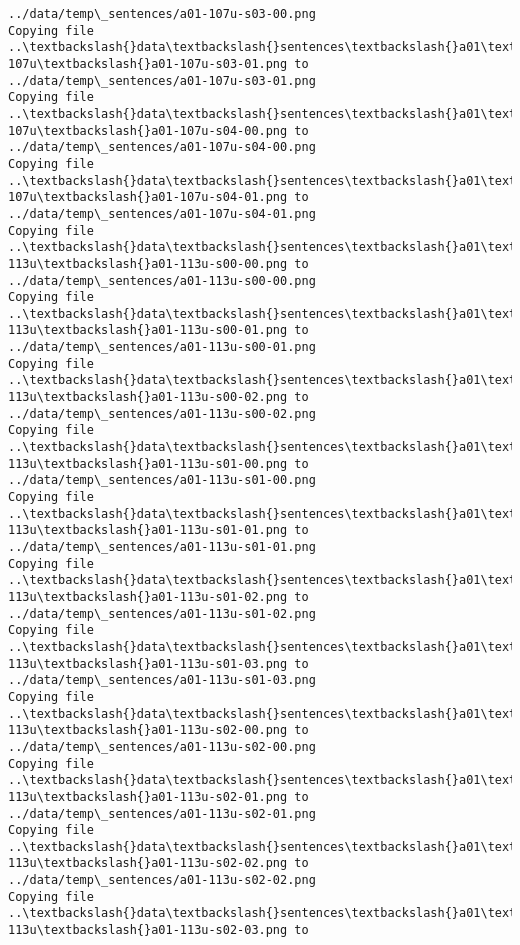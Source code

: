 \documentclass[11pt]{article}
\begin{document}
\begin{Verbatim}[commandchars=\\\{\}]
../data/temp\_sentences/a01-107u-s03-00.png
Copying file ..\textbackslash{}data\textbackslash{}sentences\textbackslash{}a01\textbackslash{}a01-107u\textbackslash{}a01-107u-s03-01.png to
../data/temp\_sentences/a01-107u-s03-01.png
Copying file ..\textbackslash{}data\textbackslash{}sentences\textbackslash{}a01\textbackslash{}a01-107u\textbackslash{}a01-107u-s04-00.png to
../data/temp\_sentences/a01-107u-s04-00.png
Copying file ..\textbackslash{}data\textbackslash{}sentences\textbackslash{}a01\textbackslash{}a01-107u\textbackslash{}a01-107u-s04-01.png to
../data/temp\_sentences/a01-107u-s04-01.png
Copying file ..\textbackslash{}data\textbackslash{}sentences\textbackslash{}a01\textbackslash{}a01-113u\textbackslash{}a01-113u-s00-00.png to
../data/temp\_sentences/a01-113u-s00-00.png
Copying file ..\textbackslash{}data\textbackslash{}sentences\textbackslash{}a01\textbackslash{}a01-113u\textbackslash{}a01-113u-s00-01.png to
../data/temp\_sentences/a01-113u-s00-01.png
Copying file ..\textbackslash{}data\textbackslash{}sentences\textbackslash{}a01\textbackslash{}a01-113u\textbackslash{}a01-113u-s00-02.png to
../data/temp\_sentences/a01-113u-s00-02.png
Copying file ..\textbackslash{}data\textbackslash{}sentences\textbackslash{}a01\textbackslash{}a01-113u\textbackslash{}a01-113u-s01-00.png to
../data/temp\_sentences/a01-113u-s01-00.png
Copying file ..\textbackslash{}data\textbackslash{}sentences\textbackslash{}a01\textbackslash{}a01-113u\textbackslash{}a01-113u-s01-01.png to
../data/temp\_sentences/a01-113u-s01-01.png
Copying file ..\textbackslash{}data\textbackslash{}sentences\textbackslash{}a01\textbackslash{}a01-113u\textbackslash{}a01-113u-s01-02.png to
../data/temp\_sentences/a01-113u-s01-02.png
Copying file ..\textbackslash{}data\textbackslash{}sentences\textbackslash{}a01\textbackslash{}a01-113u\textbackslash{}a01-113u-s01-03.png to
../data/temp\_sentences/a01-113u-s01-03.png
Copying file ..\textbackslash{}data\textbackslash{}sentences\textbackslash{}a01\textbackslash{}a01-113u\textbackslash{}a01-113u-s02-00.png to
../data/temp\_sentences/a01-113u-s02-00.png
Copying file ..\textbackslash{}data\textbackslash{}sentences\textbackslash{}a01\textbackslash{}a01-113u\textbackslash{}a01-113u-s02-01.png to
../data/temp\_sentences/a01-113u-s02-01.png
Copying file ..\textbackslash{}data\textbackslash{}sentences\textbackslash{}a01\textbackslash{}a01-113u\textbackslash{}a01-113u-s02-02.png to
../data/temp\_sentences/a01-113u-s02-02.png
Copying file ..\textbackslash{}data\textbackslash{}sentences\textbackslash{}a01\textbackslash{}a01-113u\textbackslash{}a01-113u-s02-03.png to

\end{Verbatim}
\end{document}
